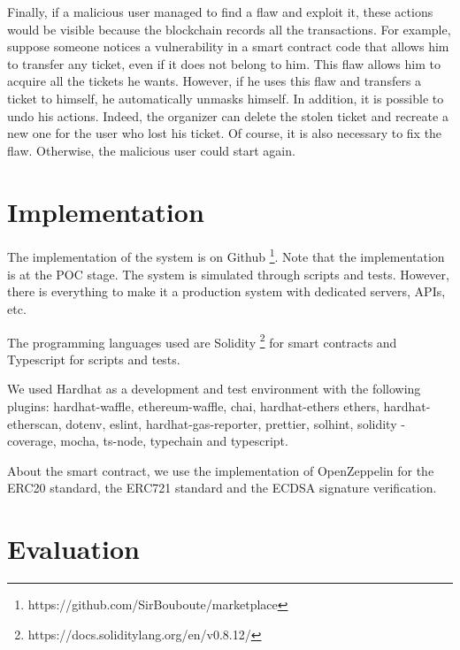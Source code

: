 \documentclass[a4paper,11pt,oneside]{report}
\begin{document}
Finally, if a malicious user managed to find a flaw and exploit it, these actions would be visible because the blockchain records all the transactions. For example, suppose someone notices a vulnerability in a smart contract code that allows him to transfer any ticket, even if it does not belong to him. This flaw allows him to acquire all the tickets he wants. However, if he uses this flaw and transfers a ticket to himself, he automatically unmasks himself. In addition, it is possible to undo his actions. Indeed, the organizer can delete the stolen ticket and recreate a new one for the user who lost his ticket. Of course, it is also necessary to fix the flaw. Otherwise, the malicious user could start again.

\chapter{Implementation}
The implementation of the system is on Github \footnote{https://github.com/SirBouboute/marketplace}. Note that the implementation is at the POC stage. The system is simulated through scripts and tests. However, there is everything to make it a production system with dedicated servers, APIs, etc.

The programming languages used are Solidity \footnote{https://docs.soliditylang.org/en/v0.8.12/} for smart contracts and Typescript for scripts and tests. 

We used Hardhat as a development and test environment with the following plugins: hardhat-waffle, ethereum-waffle, chai, hardhat-ethers ethers, hardhat-etherscan, dotenv, eslint, hardhat-gas-reporter, prettier, solhint, solidity -coverage, mocha, ts-node, typechain and typescript. 

About the smart contract, we use the implementation of OpenZeppelin for the ERC20 standard, the ERC721 standard and the ECDSA signature verification.

\chapter{Evaluation}
\end{document}

